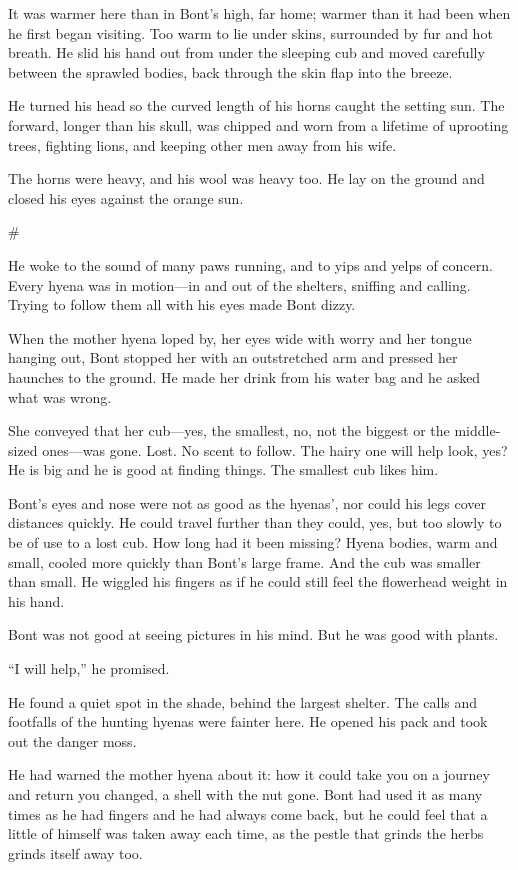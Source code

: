 It was warmer here than in Bont's high, far home; warmer than it had been when he first began visiting. Too warm to lie under skins, surrounded by fur and hot breath. He slid his hand out from under the sleeping cub and moved carefully between the sprawled bodies, back through the skin flap into the breeze.

He turned his head so the curved length of his horns caught the setting sun. The forward, longer than his skull, was chipped and worn from a lifetime of uprooting trees, fighting lions, and keeping other men away from his wife.

The horns were heavy, and his wool was heavy too. He lay on the ground and closed his eyes against the orange sun.

\#

He woke to the sound of many paws running, and to yips and yelps of concern. Every hyena was in motion---in and out of the shelters, sniffing and calling. Trying to follow them all with his eyes made Bont dizzy.

When the mother hyena loped by, her eyes wide with worry and her tongue hanging out, Bont stopped her with an outstretched arm and pressed her haunches to the ground. He made her drink from his water bag and he asked what was wrong.

She conveyed that her cub---yes, the smallest, no, not the biggest or the middle-sized ones---was gone. Lost. No scent to follow. The hairy one will help look, yes? He is big and he is good at finding things. The smallest cub likes him.

Bont's eyes and nose were not as good as the hyenas', nor could his legs cover distances quickly. He could travel further than they could, yes, but too slowly to be of use to a lost cub. How long had it been missing? Hyena bodies, warm and small, cooled more quickly than Bont's large frame. And the cub was smaller than small. He wiggled his fingers as if he could still feel the flowerhead weight in his hand.

Bont was not good at seeing pictures in his mind. But he was good with plants.

``I will help,'' he promised.

He found a quiet spot in the shade, behind the largest shelter. The calls and footfalls of the hunting hyenas were fainter here. He opened his pack and took out the danger moss.

He had warned the mother hyena about it: how it could take you on a journey and return you changed, a shell with the nut gone. Bont had used it as many times as he had fingers and he had always come back, but he could feel that a little of himself was taken away each time, as the pestle that grinds the herbs grinds itself away too.

